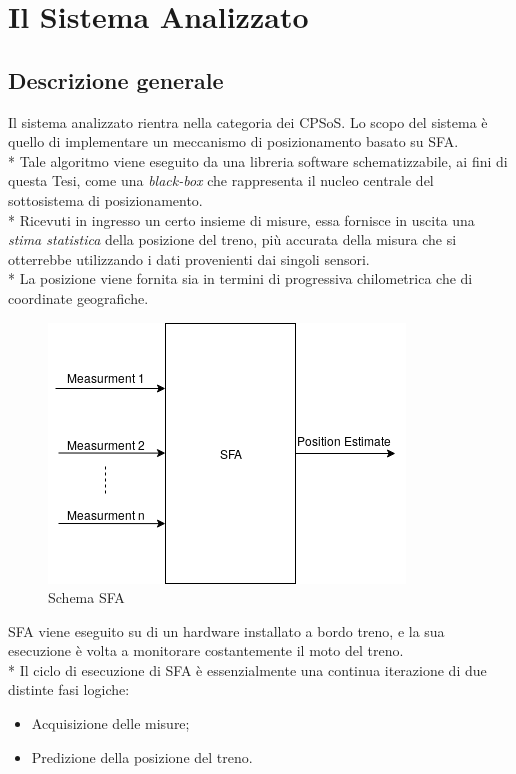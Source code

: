 \chapter{Il Sistema Analizzato}
\section{Descrizione generale}
Il sistema analizzato rientra nella categoria dei CPSoS. Lo scopo del sistema \`e quello di implementare un meccanismo di posizionamento basato su SFA.\\*
Tale algoritmo viene eseguito da una libreria software schematizzabile, ai fini di questa Tesi, come una \emph{black-box} che rappresenta il nucleo centrale del sottosistema di posizionamento.\\*
Ricevuti in ingresso un certo insieme di misure, essa fornisce in uscita una \emph{stima statistica} della posizione del treno, pi\`u accurata della misura che si otterrebbe utilizzando i dati provenienti dai singoli sensori. \cite{datafuse}\\*
La posizione viene fornita sia in termini di progressiva chilometrica che di coordinate geografiche.
\begin{figure}[h]
	\centering
	\includegraphics[scale=0.6]{img/sfaschema}
	\caption{Schema SFA}
	\label{fig:sfa}
\end{figure}
\clearpage
SFA viene eseguito su di un hardware installato a bordo treno, e la sua esecuzione \`e volta a monitorare costantemente il moto del treno.\\*
Il ciclo di esecuzione di SFA \`e essenzialmente una continua iterazione di due distinte fasi logiche:
\begin{itemize}
	\item Acquisizione delle misure;
	\item Predizione della posizione del treno.
\end{itemize}
